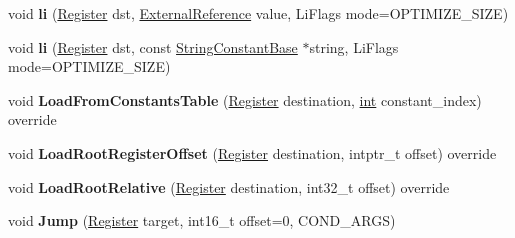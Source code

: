 \begin{DoxyCompactItemize}
\item 
\mbox{\label{classv8_1_1internal_1_1TurboAssembler_aa857485511451fffdc8cf696b9cd1bda}} 
void {\bfseries li} (\mbox{\hyperlink{classv8_1_1internal_1_1Register}{Register}} dst, \mbox{\hyperlink{classv8_1_1internal_1_1ExternalReference}{External\+Reference}} value, Li\+Flags mode=O\+P\+T\+I\+M\+I\+Z\+E\+\_\+\+S\+I\+ZE)
\item 
\mbox{\label{classv8_1_1internal_1_1TurboAssembler_ae93699c059131318d8ff428237278be8}} 
void {\bfseries li} (\mbox{\hyperlink{classv8_1_1internal_1_1Register}{Register}} dst, const \mbox{\hyperlink{classv8_1_1internal_1_1StringConstantBase}{String\+Constant\+Base}} $\ast$string, Li\+Flags mode=O\+P\+T\+I\+M\+I\+Z\+E\+\_\+\+S\+I\+ZE)
\item 
\mbox{\label{classv8_1_1internal_1_1TurboAssembler_a6c8fae865ac1fd7f79f9d4934a46392a}} 
void {\bfseries Load\+From\+Constants\+Table} (\mbox{\hyperlink{classv8_1_1internal_1_1Register}{Register}} destination, \mbox{\hyperlink{classint}{int}} constant\+\_\+index) override
\item 
\mbox{\label{classv8_1_1internal_1_1TurboAssembler_a20588856c39f30350ccd570332e761ea}} 
void {\bfseries Load\+Root\+Register\+Offset} (\mbox{\hyperlink{classv8_1_1internal_1_1Register}{Register}} destination, intptr\+\_\+t offset) override
\item 
\mbox{\label{classv8_1_1internal_1_1TurboAssembler_a77e9d10255bc9a25985ff71df883e665}} 
void {\bfseries Load\+Root\+Relative} (\mbox{\hyperlink{classv8_1_1internal_1_1Register}{Register}} destination, int32\+\_\+t offset) override
\item 
\mbox{\label{classv8_1_1internal_1_1TurboAssembler_a022e45b53d7cf7855b5b8fac43acf240}} 
void {\bfseries Jump} (\mbox{\hyperlink{classv8_1_1internal_1_1Register}{Register}} target, int16\+\_\+t offset=0, C\+O\+N\+D\+\_\+\+A\+R\+GS)
\item 
\mbox{\label{classv8_1_1internal_1_1TurboAssembler_a7ad57a7447039d3c26b2519cfc65ea21}} 

\end{DoxyCompactItemize}
